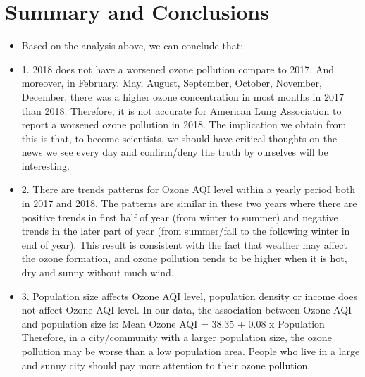 \documentclass[12pt,]{article}
\begin{document}
\newpage

\section{Summary and Conclusions}\label{summary-and-conclusions}

\begin{itemize}
\item[]Based on the analysis above, we can conclude that: 
\item[]1. 2018 does not have a worsened ozone pollution compare to 2017. And moreover, in February, May, August, September, October, November, December, there was a higher ozone concentration in most months in 2017 than 2018. Therefore, it is not accurate for American Lung Association to report a worsened ozone pollution in 2018. The implication we obtain from this is that, to become scientists, we should have critical thoughts on the news we see every day and confirm/deny the truth by ourselves will be interesting.
\item[]2. There are trends patterns for Ozone AQI level within a yearly period both in 2017 and 2018. The patterns are similar in these two years where there are positive trends in first half of year (from winter to summer) and negative trends in the later part of year (from summer/fall to the following winter in end of year). This result is consistent with the fact that weather may affect the ozone formation, and ozone pollution tends to be higher when it is hot, dry and sunny without much wind.
\item[]3. Population size affects Ozone AQI level, population density or income does not affect Ozone AQI level. In our data, the association between Ozone AQI and population size is:   
Mean Ozone AQI = 38.35 + 0.08 x Population  
Therefore, in a city/community with a larger population size, the ozone pollution may be worse than a low population area. People who live in a large and sunny city should pay more attention to their ozone pollution.
\end{itemize}
\end{document}
